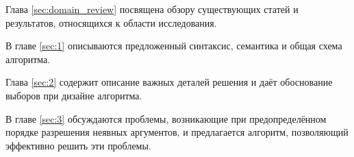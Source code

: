 \documentclass[../diploma.tex]{subfiles}
\begin{document}
Глава \ref{sec:domain_review} посвящена обзору существующих статей и результатов, относящихся к области исследования. 

В главе \ref{sec:1} описываются предложенный синтаксис, семантика и общая схема алгоритма.

Глава \ref{sec:2} содержит описание важных деталей решения и даёт обоснование выборов при дизайне алгоритма.

В главе \ref{sec:3} обсуждаются проблемы, возникающие при предопределённом порядке разрешения неявных аргументов, и предлагается алгоритм, позволяющий эффективно решить эти проблемы.
\end{document}
